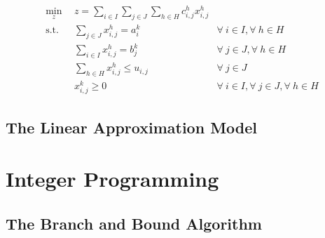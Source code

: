 \begin{subequations}\label{eqs:MCTP}
  \begin{align}
    \min_{z} \:\: & 
    z = \sum_{i \in I}\sum_{j \in J}\sum_{h \in H} c_{i,j}^{h} x_{i,j}^{h}
    & \label{eqs:MCTP_obj} \\
    \text{s.t.} \:\: &
    \sum_{j \in J} x_{i,j}^{h} = a_{i}^{k}
    &
    \forall \: i \in I, \forall \: h \in H \label{eqs:MCTP_sup} \\
    &
    \sum_{i \in I} x_{i,j}^{h} = b_{j}^{k}
    & 
    \forall \: j \in J, \forall \: h \in H \label{eqs:MCTP_dem} \\
    &
    \sum_{h \in H} x_{i,j}^{h} \leq u_{i,j}
    & 
    \forall \: j \in J \label{eqs:MCTP_cap} \\
    &
    x_{i,j}^{k} \geq 0
    &
    \forall \: i \in I, \forall \: j \in J, \forall \: h \in H \label{eqs:MCTP_x}
  \end{align}
\end{subequations}

\subsection{The Linear Approximation Model}\label{sec:approx}


\section{Integer Programming}\label{sec:ip}

\subsection{The Branch and Bound Algorithm}\label{sec:bnb}
